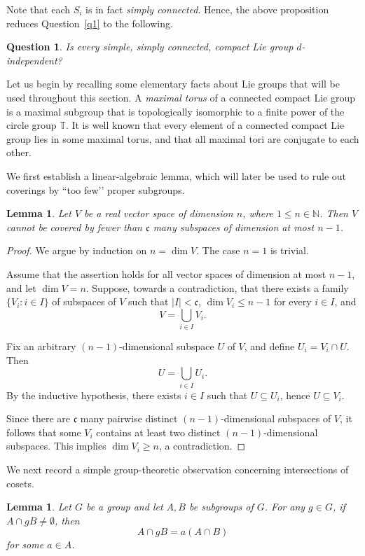 \documentclass[12pt]{amsart}
\newtheorem{lemma}[theorem]{Lemma}
\newtheorem{question}[theorem]{Question}
\theoremstyle{definition}
\theoremstyle{remark}
\begin{document}
Note that each $S_i$ is in fact \emph{simply connected}.
Hence, the above proposition reduces Question~\ref{q1} to the following.

\begin{question}
Is every simple, simply connected, compact Lie group $d$-independent?
\end{question}


Let us begin by recalling some elementary facts about Lie groups that will be used throughout this section.
A \emph{maximal torus} of a connected compact Lie group is a maximal subgroup that is topologically isomorphic to a finite power of the circle group $\mathbb{T}$.
It is well known that every element of a connected compact Lie group lies in some maximal torus, and that all maximal tori are conjugate to each other.

We first establish a linear-algebraic lemma, which will later be used to rule out coverings by “too few’’ proper subgroups.

\begin{lemma}\label{vector}
	Let $V$ be a real vector space of dimension $n$, where $1\le n\in\mathbb{N}$.
	Then $V$ cannot be covered by fewer than $\mathfrak{c}$ many subspaces of dimension at most $n-1$.
\end{lemma}

\begin{proof}
	We argue by induction on $n=\dim V$.
	The case $n=1$ is trivial.
	
	Assume that the assertion holds for all vector spaces of dimension at most $n-1$, and let $\dim V=n$.
	Suppose, towards a contradiction, that there exists a family $\{V_i:i\in I\}$ of subspaces of $V$ such that $|I|<\mathfrak{c}$, $\dim V_i\le n-1$ for every $i\in I$, and
	\[
	V=\bigcup_{i\in I}V_i.
	\]
	
	Fix an arbitrary $(n-1)$-dimensional subspace $U$ of $V$, and define $U_i=V_i\cap U$.
	Then
	\[
	U=\bigcup_{i\in I}U_i.
	\]
	By the inductive hypothesis, there exists $i\in I$ such that $U\subseteq U_i$, hence $U\subseteq V_i$.
	
	Since there are $\mathfrak{c}$ many pairwise distinct $(n-1)$-dimensional subspaces of $V$, it follows that some $V_i$ contains at least two distinct $(n-1)$-dimensional subspaces.
	This implies $\dim V_i\ge n$, a contradiction.
\end{proof}

We next record a simple group-theoretic observation concerning intersections of cosets.

\begin{lemma}\label{Inter}
	Let $G$ be a group and let $A,B$ be subgroups of $G$.
	For any $g\in G$, if $A\cap gB\neq\emptyset$, then
	\[
	A\cap gB=a(A\cap B)
	\]
	for some $a\in A$.
\end{lemma}
\end{document}
